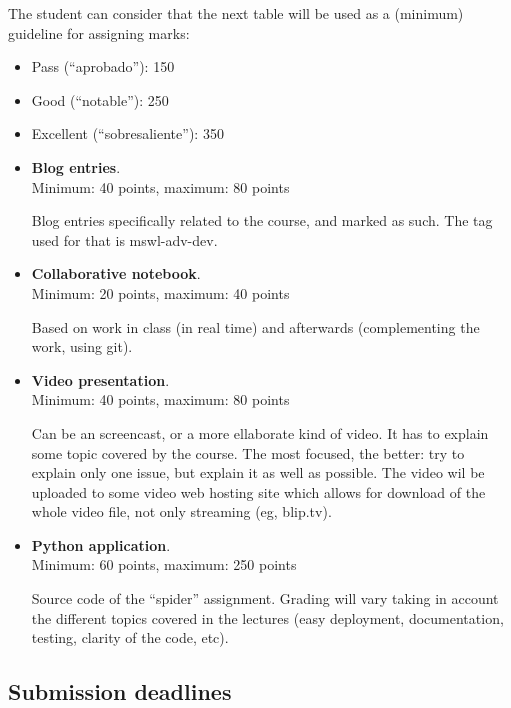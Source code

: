 \documentclass[a4paper]{article}
\begin{document}
The student can consider that the next table will be used as a
(minimum) guideline for assigning marks:

\begin{itemize}
\item Pass (``aprobado''): 150
\item Good (``notable''): 250
\item Excellent (``sobresaliente''): 350
\end{itemize}

\begin{itemize}
\item \textbf{Blog entries}. \\
  Minimum: 40 points, maximum: 80 points

  Blog entries specifically related to the course, and marked as such. The tag used for that is mswl-adv-dev.

\item \textbf{Collaborative notebook}. \\
  Minimum: 20 points, maximum: 40 points

  Based on work in class (in real time) and afterwards (complementing the work, using git).

\item \textbf{Video presentation}. \\
  Minimum: 40 points, maximum: 80 points

  Can be an screencast, or a more ellaborate kind of video. It has to
explain some topic covered by the course. The most focused, the
better: try to explain only one issue, but explain it as well as
possible. The video wil be uploaded to some video web hosting site
which allows for download of the whole video file, not only streaming
(eg, blip.tv).

\item \textbf{Python application}. \\
  Minimum: 60 points, maximum: 250 points

Source code of the ``spider'' assignment. Grading will vary taking in
account the different topics covered in the lectures (easy deployment,
documentation, testing, clarity of the code, etc).

\end{itemize}

\subsection{Submission deadlines}
\end{document}
